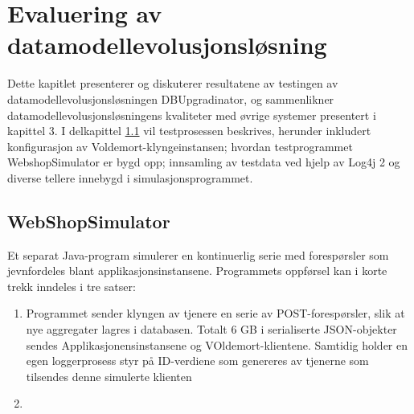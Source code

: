 
\chapter{Evaluering av datamodellevolusjonsløsning}

Dette kapitlet presenterer og diskuterer resultatene av testingen av datamodellevolusjonsløsningen DBUpgradinator, og sammenlikner datamodellevolusjonsløsningens kvaliteter med øvrige systemer presentert i kapittel 3. I delkapittel \ref{prog} vil testprosessen beskrives, herunder inkludert konfigurasjon av Voldemort-klyngeinstansen; hvordan testprogrammet WebshopSimulator er bygd opp; innsamling av testdata ved hjelp av Log4j 2 og diverse tellere innebygd i simulasjonsprogrammet.

\section{WebShopSimulator} \label{prog}

Et separat Java-program simulerer en kontinuerlig serie med forespørsler som jevnfordeles blant applikasjonsinstansene. Programmets oppførsel kan i korte trekk inndeles i tre satser:

\begin{enumerate}
  \item Programmet sender klyngen av tjenere en serie av POST-forespørsler, slik at nye aggregater lagres i databasen. Totalt 6 GB i serialiserte JSON-objekter sendes Applikasjonensinstansene og VOldemort-klientene. Samtidig holder en egen loggerprosess styr på ID-verdiene som genereres av tjenerne som tilsendes denne simulerte klienten
  \item 
\end{enumerate}

\cleardoublepage

